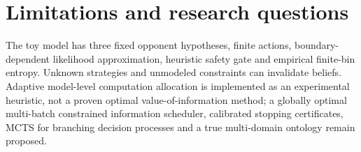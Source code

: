 \documentclass[11pt]{article}
\begin{document}
\section{Limitations and research questions}
The toy model has three fixed opponent hypotheses, finite actions, boundary-dependent likelihood approximation, heuristic safety gate and empirical finite-bin entropy. Unknown strategies and unmodeled constraints can invalidate beliefs. Adaptive model-level computation allocation is implemented as an experimental heuristic, not a proven optimal value-of-information method; a globally optimal multi-batch constrained information scheduler, calibrated stopping certificates, MCTS for branching decision processes and a true multi-domain ontology remain proposed.
\end{document}
